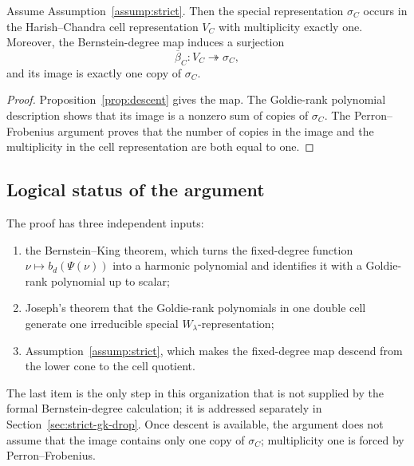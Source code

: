 \begin{thm}
Assume Assumption~\ref{assump:strict}. Then the special representation
$\sigma_C$ occurs in the Harish--Chandra cell representation $V_C$ with
multiplicity exactly one. Moreover, the Bernstein-degree map induces a
surjection
\[
  \overline\beta_C : V_C \twoheadrightarrow \sigma_C,
\]
and its image is exactly one copy of $\sigma_C$.
\end{thm}

\begin{proof}
Proposition~\ref{prop:descent} gives the map. The Goldie-rank polynomial
description shows that its image is a nonzero sum of copies of $\sigma_C$.
The Perron--Frobenius argument proves that the number of copies in the image
and the multiplicity in the cell representation are both equal to one.
\end{proof}

\subsection{Logical status of the argument}

The proof has three independent inputs:
\begin{enumerate}
  \item the Bernstein--King theorem, which turns the fixed-degree function
        $\nu \mapsto b_d(\Psi(\nu))$ into a harmonic polynomial and identifies
        it with a Goldie-rank polynomial up to scalar;
  \item Joseph's theorem that the Goldie-rank polynomials in one double cell
        generate one irreducible special $W_\lambda$-representation;
  \item Assumption~\ref{assump:strict}, which makes the fixed-degree map
        descend from the lower cone to the cell quotient.
\end{enumerate}
The last item is the only step in this organization that is not supplied by
the formal Bernstein-degree calculation; it is addressed separately in
Section~\ref{sec:strict-gk-drop}. Once descent is available, the
argument does not assume that the image contains only one copy of
$\sigma_C$; multiplicity one is forced by Perron--Frobenius.




